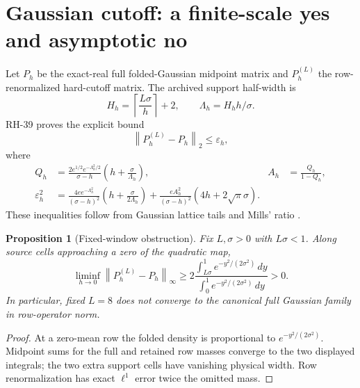 \documentclass[11pt]{article}
\newtheorem{proposition}[theorem]{Proposition}
\theoremstyle{remark}
\newcommand{\norm}[1]{\left\lVert #1\right\rVert}
\begin{document}
\section{Gaussian cutoff: a finite-scale yes and asymptotic no}

Let \(P_h\) be the exact-real full folded-Gaussian midpoint matrix and
\(P_h^{(L)}\) the row-renormalized hard-cutoff matrix.  The archived support
half-width is
\[
 H_h=\left\lceil\frac{L\sigma}{h}\right\rceil+2,
 \qquad \Lambda_h=H_hh/\sigma.
\]
RH-39 proves the explicit bound
\begin{equation}
 \norm{P_h^{(L)}-P_h}_2\le\varepsilon_h,
 \label{eq:cutoff-bound}
\end{equation}
where
\begin{align*}
 Q_h&=
 \frac{2e^{1/2}e^{-\Lambda_h^2/2}}{\sigma-h}
 \left(h+\frac{\sigma}{\Lambda_h}\right),
 &A_h&=\frac{Q_h}{1-Q_h},\\
 \varepsilon_h^2&=
 \frac{4e e^{-\Lambda_h^2}}{(\sigma-h)^2}
 \left(h+\frac{\sigma}{2\Lambda_h}\right)
 +\frac{eA_h^2}{(\sigma-h)^2}
 (4h+2\sqrt\pi\sigma).
\end{align*}
These inequalities follow from Gaussian lattice tails and Mills' ratio
\citep{Gordon1941,WangCutoff2026}.

\begin{proposition}[Fixed-window obstruction]
\label{prop:fixed-no-go}
Fix \(L,\sigma>0\) with \(L\sigma<1\).  Along source cells approaching a
zero of the quadratic map,
\begin{equation}
 \liminf_{h\to0}\norm{P_h^{(L)}-P_h}_\infty
 \ge2\frac{\int_{L\sigma}^{1}e^{-y^2/(2\sigma^2)}\,dy}
 {\int_0^1e^{-y^2/(2\sigma^2)}\,dy}>0.
 \label{eq:fixed-no-go}
\end{equation}
In particular, fixed \(L=8\) does not converge to the canonical full
Gaussian family in row-operator norm.
\end{proposition}

\begin{proof}
At a zero-mean row the folded density is proportional to
\(e^{-y^2/(2\sigma^2)}\).  Midpoint sums for the full and retained row masses
converge to the two displayed integrals; the two extra support cells have
vanishing physical width.  Row renormalization has exact \(\ell^1\) error
twice the omitted mass.
\end{proof}
\end{document}
